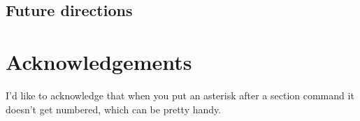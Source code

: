 \documentclass[twocolumn]{article}
\begin{document}
\subsection{Future directions}

\section*{Acknowledgements}

I'd like to acknowledge that when you put an asterisk after a section command it doesn't get numbered, which can be pretty handy. 

  

\clearpage

% 
\clearpage
\end{document}
